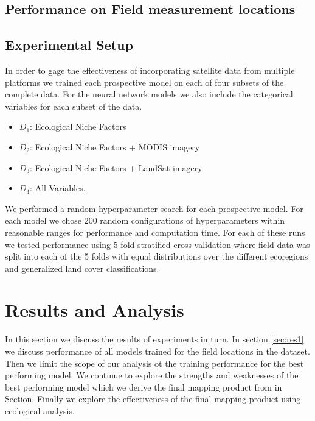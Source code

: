 \def\year{2017}\relax \documentclass[letterpaper]{article}
\begin{document}
\subsection{Performance on Field measurement locations}
\subsection{Experimental Setup}
In order to gage the effectiveness of incorporating satellite data from multiple platforms we trained each prospective model on each of four subsets of the complete data. For the neural network models we also include the categorical variables for each subset of the data. 
\begin{itemize}
	\item $D_1$: Ecological Niche Factors 
	\item $D_2$:  Ecological Niche Factors + MODIS imagery
	\item $D_3$:  Ecological Niche Factors + LandSat imagery
	\item $D_4$: All Variables.
\end{itemize} 
We performed a random hyperparameter search for each prospective model. For each model we chose 200 random configurations of hyperparameters within reasonable ranges for performance and computation time. For each of these runs we tested performance using 5-fold stratified cross-validation where field data was split  into each of the 5 folds with equal distributions over the different ecoregions and generalized land cover classifications. 
\section{Results and Analysis}
In this section we discuss the results of experiments in turn. In section \ref{sec:res1} we discuss performance of all models trained for the field locations in the dataset. Then we limit the scope of our analysis ot the training performance for the best performing model. We continue to explore the strengths and weaknesses of the best performing model which we derive the final mapping product from in Section. Finally we explore the effectiveness of the final mapping product using ecological analysis. 
\end{document}
